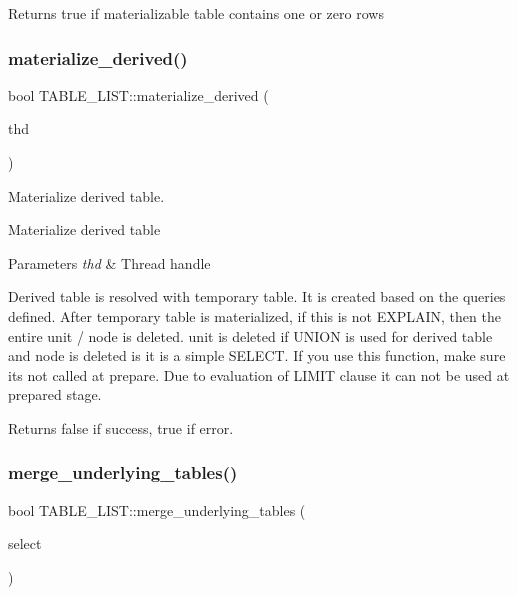 \begin{DoxyReturn}{Returns}
true if materializable table contains one or zero rows 
\end{DoxyReturn}
\mbox{\label{structTABLE__LIST_af74c8acef2390fbe4337b75755991839}} 
\subsubsection{\texorpdfstring{materialize\+\_\+derived()}{materialize\_derived()}}
{\footnotesize\ttfamily bool T\+A\+B\+L\+E\+\_\+\+L\+I\+S\+T\+::materialize\+\_\+derived (\begin{DoxyParamCaption}\item[{T\+HD $\ast$}]{thd }\end{DoxyParamCaption})}



Materialize derived table. 

Materialize derived table


\begin{DoxyParams}{Parameters}
{\em thd} & Thread handle\\
\hline
\end{DoxyParams}
Derived table is resolved with temporary table. It is created based on the queries defined. After temporary table is materialized, if this is not E\+X\+P\+L\+A\+IN, then the entire unit / node is deleted. unit is deleted if U\+N\+I\+ON is used for derived table and node is deleted is it is a simple S\+E\+L\+E\+CT. If you use this function, make sure it\textquotesingle{}s not called at prepare. Due to evaluation of L\+I\+M\+IT clause it can not be used at prepared stage.

\begin{DoxyReturn}{Returns}
false if success, true if error. 
\end{DoxyReturn}
\mbox{\label{structTABLE__LIST_a4d72f5a66dc629da7d156fc1afd564c6}} 
\subsubsection{\texorpdfstring{merge\+\_\+underlying\+\_\+tables()}{merge\_underlying\_tables()}}
{\footnotesize\ttfamily bool T\+A\+B\+L\+E\+\_\+\+L\+I\+S\+T\+::merge\+\_\+underlying\+\_\+tables (\begin{DoxyParamCaption}\item[{class st\+\_\+select\+\_\+lex $\ast$}]{select }\end{DoxyParamCaption})}



